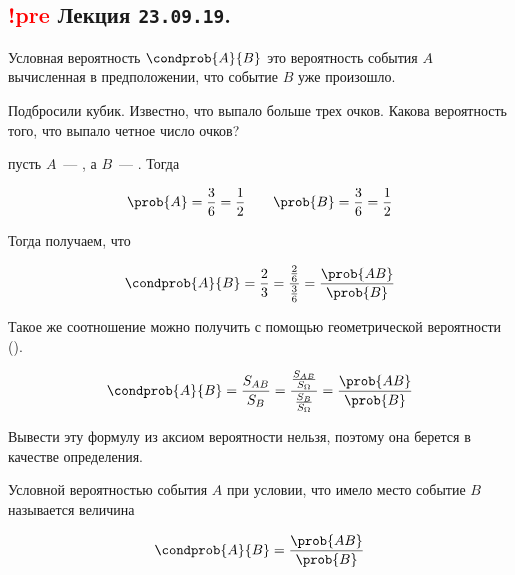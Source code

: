 \subsection{%
  \textcolor{red}{!pre} Лекция \texttt{23.09.19}.%
}

Условная вероятность \(\condprob{A}{B}\) это вероятность события \(A\)
вычисленная в предположении, что событие \(B\) уже произошло.

\begin{example}
  Подбросили кубик. Известно, что выпало больше трех очков. Какова вероятность
  того, что выпало четное число очков?

  \solution{} пусть \(A\)~--- , а \(B\)~---
  . Тогда

  \begin{equation*}
    \prob{A} = \frac{3}{6} = \frac{1}{2}
    \qquad
    \prob{B} = \frac{3}{6} = \frac{1}{2}
  \end{equation*}

  Тогда получаем, что

  \begin{equation*}
    \condprob{A}{B}
    = \frac{2}{3}
    = \frac{\frac{2}{6}}{\frac{3}{6}}
    = \frac{\prob{A B}}{\prob{B}}
  \end{equation*}

  Такое же соотношение можно получить с помощью геометрической вероятности
  ().

  \begin{equation*}
    \condprob{A}{B}
    = \frac{S_{AB}}{S_B}
    = \frac{\frac{S_{AB}}{S_{\Omega}}}{\frac{S_B}{S_{\Omega}}}
    = \frac{\prob{A B}}{\prob{B}}
  \end{equation*}
\end{example}


\begin{remark}
  Вывести эту формулу из аксиом вероятности нельзя, поэтому она берется в
  качестве определения.
\end{remark}

\begin{definition} \label{def:cond-prob}
  Условной вероятностью события \(A\) при условии, что имело место событие \(B\)
  называется величина

  \begin{equation*}
    \condprob{A}{B} = \frac{\prob{A B}}{\prob{B}}
  \end{equation*}
\end{definition}

